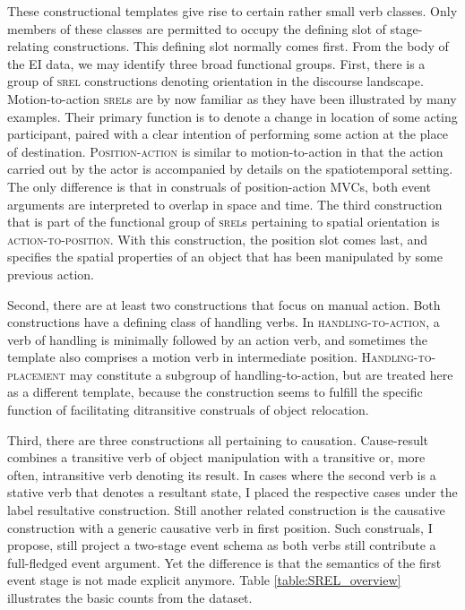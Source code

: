 These constructional templates give rise to certain rather small verb classes. Only members of these classes are permitted to occupy the defining slot of stage-relating constructions. This defining slot normally comes first. From the body of the EI data, we may identify three broad functional groups. First, there is a group of \textsc{srel} constructions denoting orientation in the discourse landscape. Motion-to-action \textsc{srel}s are by now familiar as they have been illustrated by many examples. Their primary function is to denote a change in location of some acting participant, paired with a clear intention of performing some action at the place of destination. \textsc{Position-action} is similar to motion-to-action in that the action carried out by the actor is accompanied by details on the spatiotemporal setting. The only difference is that in construals of position-action MVCs, both event arguments are interpreted to overlap in space and time. The third construction that is part of the functional group of \textsc{srel}s pertaining to spatial orientation is \textsc{action-to-position}. With this construction, the position slot comes last, and specifies the spatial properties of an object that has been manipulated by some previous action. 

Second, there are at least two constructions that focus on manual action. Both constructions have a defining class of handling verbs. In \textsc{handling-to-action}, a verb of handling is minimally followed by an action verb, and sometimes the template also comprises a motion verb in intermediate position. \textsc{Handling-to-placement} may constitute a subgroup of handling-to-action, but are treated here as a different template, because the construction seems to fulfill the specific function of facilitating ditransitive construals of object relocation.

Third, there are three constructions all pertaining to causation. Cause-result combines a transitive verb of object manipulation with a transitive or, more often, intransitive verb denoting its result. In cases where the second verb is a stative verb that denotes a resultant state, I placed the respective cases under the label resultative construction. Still another related construction is the causative construction with a generic causative verb in first position. Such construals, I propose, still project a two-stage event schema as both verbs still contribute a full-fledged event argument. Yet the difference is that the semantics of the first event stage is not made explicit anymore. Table \ref{table:SREL_overview} illustrates the basic counts from the dataset.

